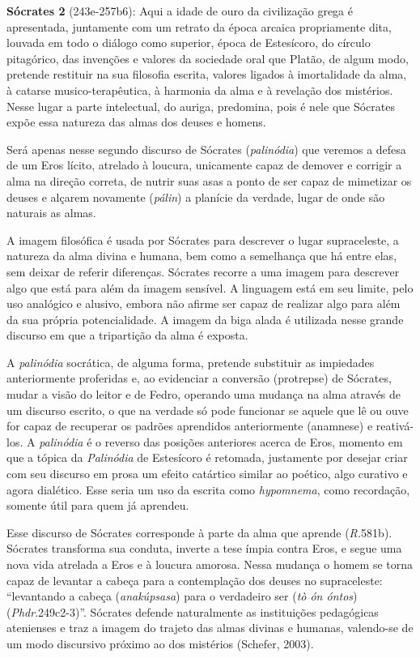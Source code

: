 \textbf{Sócrates 2} (243e-257b6): Aqui a idade de ouro da civilização
grega é apresentada, juntamente com um retrato da época arcaica
propriamente dita, louvada em todo o diálogo como superior, época de
Estesícoro, do círculo pitagórico, das invenções e valores da sociedade
oral que Platão, de algum modo, pretende restituir na sua filosofia
escrita, valores ligados à imortalidade da alma, à catarse
musico-terapêutica, à harmonia da alma e à revelação dos mistérios.
Nesse lugar a parte intelectual, do auriga, predomina, pois é nele que
Sócrates expõe essa natureza das almas dos deuses e homens.

Será apenas nesse segundo discurso de Sócrates (\emph{palinódia}) que
veremos a defesa de um Eros lícito, atrelado à loucura, unicamente capaz
de demover e corrigir a alma na direção correta, de nutrir suas asas a
ponto de ser capaz de mimetizar os deuses e alçarem novamente
(\emph{pálin}) a planície da verdade, lugar de onde são naturais as
almas.

A imagem filosófica é usada por Sócrates para descrever o lugar
supraceleste, a natureza da alma divina e humana, bem como a semelhança
que há entre elas, sem deixar de referir diferenças. Sócrates recorre a
uma imagem para descrever algo que está para além da imagem sensível. A
linguagem está em seu limite, pelo uso analógico e alusivo, embora não
afirme ser capaz de realizar algo para além da sua própria
potencialidade. A imagem da biga alada é utilizada nesse grande discurso
em que a tripartição da alma é exposta.

A \emph{palinódia} socrática, de alguma forma, pretende substituir as
impiedades anteriormente proferidas e, ao evidenciar a conversão
(protrepse) de Sócrates, mudar a visão do leitor e de Fedro, operando
uma mudança na alma através de um discurso escrito, o que na verdade só
pode funcionar se aquele que lê ou ouve for capaz de recuperar os
padrões aprendidos anteriormente (anamnese) e reativá-los. A
\emph{palinódia} é o reverso das posições anteriores acerca de Eros,
momento em que a tópica da \emph{Palinódia} de Estesícoro é retomada,
justamente por desejar criar com seu discurso em prosa um efeito
catártico similar ao poético, algo curativo e agora dialético. Esse
seria um uso da escrita como \emph{hypomnema}, como recordação, somente
útil para quem já aprendeu.

Esse discurso de Sócrates corresponde à parte da alma que aprende
(\emph{R.}581b). Sócrates transforma sua conduta, inverte a tese ímpia
contra Eros, e segue uma nova vida atrelada a Eros e à loucura amorosa.
Nessa mudança o homem se torna capaz de levantar a cabeça para a
contemplação dos deuses no supraceleste: ``levantando a cabeça
(\emph{anakúpsasa}) para o verdadeiro ser (\emph{tò ón óntos})
(\emph{Phdr}.249c2-3)''. Sócrates defende naturalmente as instituições
pedagógicas atenienses e traz a imagem do trajeto das almas divinas e
humanas, valendo-se de um modo discursivo próximo ao dos mistérios
(Schefer, 2003).


